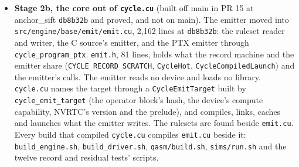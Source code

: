 \begin{enumerate}
\begin{itemize}
\begin{enumerate}
\begin{itemize}
\item \textbf{Stage 2b, the core out of \texttt{cycle.\allowbreak{}cu}} (built off main in PR 15 at anchor\_\allowbreak{}sift \texttt{db8b32b} and proved, and not on main). The emitter moved into \texttt{src/\allowbreak{}engine/\allowbreak{}base/\allowbreak{}emit/\allowbreak{}emit.\allowbreak{}cu}, 2,162 lines at \texttt{db8b32b}: the ruleset reader and writer, the C source's emitter, and the PTX emitter through \texttt{cycle\_\allowbreak{}program\_\allowbreak{}ptx}. \texttt{emit.\allowbreak{}h}, 81 lines, holds what the record machine and the emitter share (\texttt{CYCLE\_\allowbreak{}RECORD\_\allowbreak{}SCRATCH}, \texttt{CycleHot}, \texttt{CycleCompiledLaunch}) and the emitter's calls. The emitter reads no device and loads no library. \texttt{cycle.\allowbreak{}cu} names the target through a \texttt{CycleEmitTarget} built by \texttt{cycle\_\allowbreak{}emit\_\allowbreak{}target} (the operator block's hash, the device's compute capability, NVRTC's version and the prelude), and compiles, links, caches and launches what the emitter writes. The rulesets are found beside \texttt{emit.\allowbreak{}cu}. Every build that compiled \texttt{cycle.\allowbreak{}cu} compiles \texttt{emit.\allowbreak{}cu} beside it: \texttt{build\_\allowbreak{}engine.\allowbreak{}sh}, \texttt{build\_\allowbreak{}driver.\allowbreak{}sh}, \texttt{qasm/\allowbreak{}build.\allowbreak{}sh}, \texttt{sims/\allowbreak{}run.\allowbreak{}sh} and the twelve record and residual tests' scripts.


\end{itemize}
\end{enumerate}
\end{itemize}
\end{enumerate}
